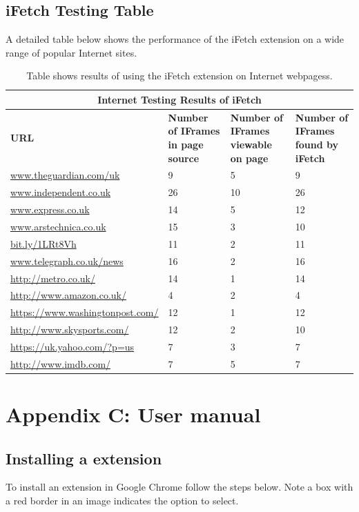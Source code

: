 \documentclass[12pt]{article}
\begin{document}
\subsection{iFetch Testing Table} \label{iFetchTesting}
A detailed table below shows the performance of the iFetch extension on a wide range of popular Internet sites. 

{
\begin{table} [H]
\centering
\begin{tabular}{ |p{4cm}|p{3cm}|p{3cm}| p{3cm} | }
\hline
\multicolumn{4}{|c|}{\textbf{Internet Testing Results of iFetch}} \\
\hline
\textbf{URL} & \textbf{Number of IFrames in page source} & \textbf{Number of IFrames viewable on page} & \textbf{Number of IFrames found by iFetch} \\
\hline
\url{www.theguardian.com/uk} & 9 & 5 & 9 \\
\hline
\url{www.independent.co.uk} & 26 & 10 & 26 \\
\hline
\url{www.express.co.uk} & 14 & 5 & 12 \\
\hline
\url{www.arstechnica.co.uk} & 15 & 3 & 10  \\
\hline
\url{bit.ly/1LRt8Vh} & 11 & 2 & 11 \\
\hline
\url{www.telegraph.co.uk/news} & 16 & 2 & 16\\
\hline
\url{http://metro.co.uk/} & 14 & 1 & 14 \\
\hline
\url{http://www.amazon.co.uk/} & 4 & 2 & 4 \\
\hline
\url{https://www.washingtonpost.com/} & 12 & 1 & 12 \\
\hline
\url{http://www.skysports.com/} & 12 & 2 & 10\\
\hline
\url{https://uk.yahoo.com/?p=us} & 7 & 3 & 7 \\
\hline
\url{http://www.imdb.com/} & 7 & 5 & 7 \\
\hline
\end{tabular}
\caption{Table shows results of using the iFetch extension on Internet webpagess.}
\label{table:5}
\end{table}
}

\section{Appendix C: User manual} \label{userman}

\subsection{Installing a extension} \label{installPlugin}
To install an extension in Google Chrome follow the steps below. Note a box with a red border in an image indicates the option to select. 
\end{document}
